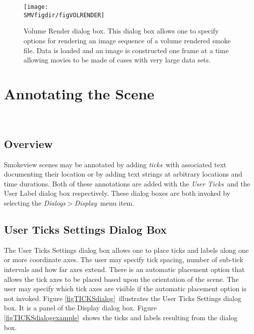 \documentclass[11pt,twoside]{book}
\begin{document}
\begin{figure}[bph]
\centerline{
\texttt{[image: \\SMVfigdir/figVOLRENDER]}
}
\caption[Volume Render dialog box.]{Volume Render dialog box.
This dialog box allows one to specify
options for rendering an image sequence of a volume rendered smoke file. Data is loaded
and an image is constructed one frame at a time allowing movies to be made of cases
with very large data sets.
}
\label{figVOLRENDER}
\end{figure}


\chapter{Annotating the Scene}
\label{section:annotate}\ \label{subsect_features}
\section{Overview}
Smokeview scenes may be annotated by adding {\em ticks}\ with associated
text documenting their location
or by adding text strings at arbitrary locations and time durations.
Both of these annotations
are added with the {\em User Ticks}\ and the User Label dialog
box respectively.  These dialog boxes are both invoked by selecting the
{\em Dialogs$>$Display}\ menu item.

\section{User Ticks Settings Dialog Box}
The User Ticks Settings dialog box allows one to place
ticks and labels along one or more coordinate axes. The
user may specify tick spacing, number of sub-tick intervals and
how far axes extend.  There is an automatic placement option that
allows the tick axes to be placed based upon the orientation of
the scene.  The user may specify which tick axes are visible if
the automatic placement option is not invoked.  Figure
\ref{figTICKSdialog}\ illustrates the User Ticks Settings
dialog box.  It is a panel of the Display dialog box.
Figure \ref{figTICKSdialogexample}\ shows the ticks and labels
resulting from the dialog box.
\end{document}
